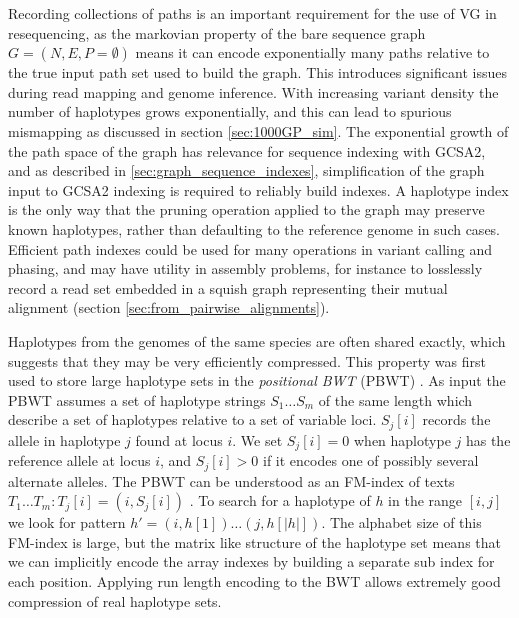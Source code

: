 Recording collections of paths is an important requirement for the use of VG in resequencing, as the markovian property of the bare sequence graph $G = (N, E, P= \emptyset)$ means it can encode exponentially many paths relative to the true input path set used to build the graph.
This introduces significant issues during read mapping and genome inference.
With increasing variant density the number of haplotypes grows exponentially, and this can lead to spurious mismapping as discussed in section \ref{sec:1000GP_sim}.
The exponential growth of the path space of the graph has relevance for sequence indexing with GCSA2, and as described in \ref{sec:graph_sequence_indexes}, simplification of the graph input to GCSA2 indexing is required to reliably build indexes.
A haplotype index is the only way that the pruning operation applied to the graph may preserve known haplotypes, rather than defaulting to the reference genome in such cases.
Efficient path indexes could be used for many operations in variant calling and phasing, and may have utility in assembly problems, for instance to losslessly record a read set embedded in a squish graph representing their mutual alignment (section \ref{sec:from_pairwise_alignments}).

Haplotypes from the genomes of the same species are often shared exactly, which suggests that they may be very efficiently compressed.
This property was first used to store large haplotype sets in the \emph{positional BWT} (PBWT) \cite{durbin2014efficient}.
As input the PBWT assumes a set of haplotype strings $S_1 \ldots S_m$ of the same length which describe a set of haplotypes relative to a set of variable loci.
$S_j[i]$ records the allele in haplotype $j$ found at locus $i$.
We set $S_j[i] = 0$ when haplotype $j$ has the reference allele at locus $i$, and $S_j[i] > 0$ if it encodes one of possibly several alternate alleles.
The PBWT can be understood as an FM-index of texts $T_1 \ldots T_m : T_j[i] = (i, S_j[i])$ \cite{gagie2017wheeler}.
To search for a haplotype of $h$ in the range $[i,j]$ we look for pattern $h' = (i, h[1]) \ldots (j, h[|h|])$.
The alphabet size of this FM-index is large, but the matrix like structure of the haplotype set means that we can implicitly encode the array indexes by building a separate sub index for each position.
Applying run length encoding to the BWT allows extremely good compression of real haplotype sets.

